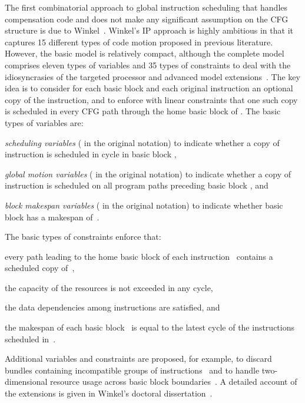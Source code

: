 \documentclass[acmsmall,authorversion,nonacm]{acmart}
\newcommand{\var}[2]{}
\begin{document}
The first combinatorial approach to global instruction scheduling that
handles compensation code and does not make any significant assumption
on the CFG structure is due to Winkel~\cite{Winkel2004,Winkel2007}.
Winkel's IP approach is highly ambitious in that it captures 15
different types of code motion proposed in previous literature.
However, the basic model is relatively compact, although the complete
model comprises eleven types of variables and 35 types of constraints
to deal with the idiosyncrasies of the targeted processor and advanced
model extensions~\cite{Winkel2007}.
The key idea is to consider for each basic block  and each original
instruction  an optional copy of the instruction, and to enforce
with linear constraints that one such copy is scheduled in every CFG
path through the home basic block of .
The basic types of variables are:
\begin{inparaitem}[]
\item \emph{scheduling variables} \var{s}{i,k,b} ( in the
  original notation) to indicate whether a copy of instruction  is
  scheduled in cycle  in basic block ,
\item \emph{global motion variables} \var{c}{i,b} (
  in the original notation) to indicate whether a copy of instruction
   is scheduled on all program paths preceding basic block , and
\item \emph{block makespan variables} \var{m}{b,k} ( in the
  original notation) to indicate whether basic block  has a
  makespan of~.
\end{inparaitem}
The basic types of constraints enforce that:
\begin{inparaitem}[]
\item every path leading to the home basic block of each
  instruction~ contains a scheduled copy of~,
\item the capacity of the resources is not exceeded in any cycle,
\item the data dependencies among instructions are satisfied, and
\item the makespan of each basic block~ is equal to the latest
  cycle of the instructions scheduled in~.
\end{inparaitem}
Additional variables and constraints are proposed, for example, to
discard bundles containing incompatible groups of
instructions~\cite{Winkel2004} and to handle two-dimensional resource
usage across basic block boundaries~\cite{Winkel2007}.
A detailed account of the extensions is given in Winkel's doctoral
dissertation~\cite[Chapter 6]{Winkel2004b}.
\end{document}
